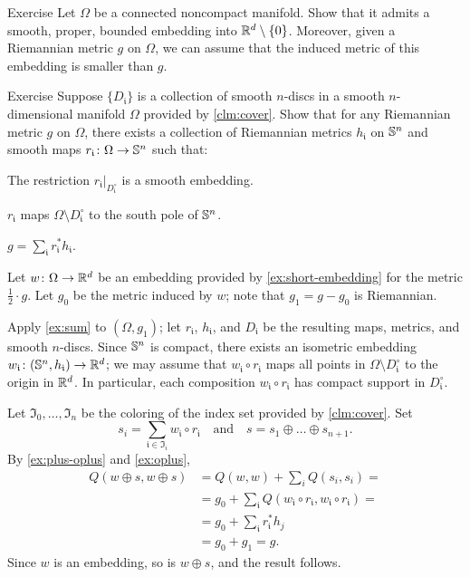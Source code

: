 \begin{thm}{Exercise}\label{ex:short-embedding}
Let $\Omega$ be a connected noncompact manifold.
Show that it admits a smooth, proper, bounded embedding into $\mathbb{R}^d\setminus\{0\}$.
Moreover, given a Riemannian metric $g$ on $\Omega$, we can assume that the induced metric of this embedding is smaller than $g$.
\end{thm}

\begin{thm}{Exercise}\label{ex:sum}
Suppose $\{D_{\mathfrak{i}}\}$ is a collection of smooth $n$-discs in a smooth $n$-dimensional manifold $\Omega$ provided by \ref{clm:cover}.
Show that for any Riemannian metric $g$ on $\Omega$, there exists a collection of Riemannian metrics $h_{\mathfrak{i}}$ on $\mathbb{S}^n$ and smooth maps $r_{\mathfrak{i}}\colon\Omega \to \mathbb{S}^n$ such that:

\begin{subthm}{}
The restriction $r_{\mathfrak{i}}|_{D_{\mathfrak{i}}^\circ}$ is a smooth embedding.
\end{subthm}

\begin{subthm}{}
$r_{\mathfrak{i}}$ maps $\Omega\setminus D_{\mathfrak{i}}^\circ$ to the south pole of $\mathbb{S}^n$.
\end{subthm}

\begin{subthm}{}
$g=\sum_{\mathfrak{i}} r_{\mathfrak{i}}^*h_{\mathfrak{i}}$.
\end{subthm}
\end{thm}

Let $w\colon\Omega\to\mathbb{R}^d$ be an embedding provided by \ref{ex:short-embedding} for the metric $\tfrac12\cdot g$.
Let $g_0$ be the metric induced by $w$;
note that $g_1=g-g_0$ is Riemannian.

Apply \ref{ex:sum} to $(\Omega,g_1)$;
let $r_{\mathfrak{i}}$, $h_{\mathfrak{i}}$, and $D_{\mathfrak{i}}$ be the resulting maps, metrics, and smooth $n$-discs.
Since $\mathbb{S}^n$ is compact, there exists an isometric embedding $w_{\mathfrak{i}}\colon (\mathbb{S}^n, h_{\mathfrak{i}}) \to \mathbb{R}^d$;
we may assume that $w_{\mathfrak{i}} \circ r_{\mathfrak{i}}$ maps all points in $\Omega\setminus D_{\mathfrak{i}}^\circ$ to the origin in $\mathbb{R}^d$.
In particular, each composition $w_{\mathfrak{i}} \circ r_{\mathfrak{i}}$ has compact support in $D_{\mathfrak{i}}^\circ$.

Let $\mathfrak{I}_0,\dots,\mathfrak{I}_n$ be the coloring of the index set provided by \ref{clm:cover}.
Set
\[s_i=\sum_{\mathfrak{i}\in \mathfrak{I}_i} w_{\mathfrak{i}}\circ r_{\mathfrak{i}}
\quad\text{and}\quad
s=s_1\oplus\dots\oplus s_{n+1}.
\]
By \ref{ex:plus-oplus} and \ref{ex:oplus},
\begin{align*}
Q(w\oplus s,w\oplus s)&=Q(w,w)+\sum_i Q(s_i,s_i)=
\\
&=g_0+\sum_{\mathfrak{i}} Q(w_{\mathfrak{i}}\circ r_{\mathfrak{i}},w_{\mathfrak{i}}\circ r_{\mathfrak{i}})=
\\
&=g_0+\sum_{\mathfrak{i}} r^*_{\mathfrak{i}}h_j
\\
&=g_0+g_1=g.
\end{align*}
Since $w$ is an embedding, so is $w \oplus s$, and the result follows.
\qeds

